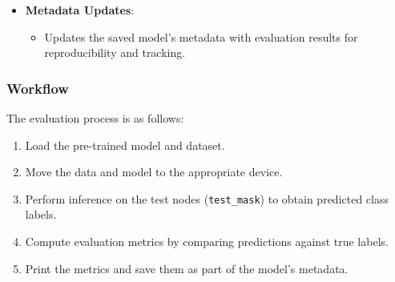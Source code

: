 {\begin{itemize}
		\item \textbf{Metadata Updates}:
		\begin{itemize}
			\item Updates the saved model's metadata with evaluation results for reproducibility and tracking.
		\end{itemize}
	\end{itemize}
	
	\subsubsection{Workflow}
	
	The evaluation process is as follows:
	\begin{enumerate}
		\item Load the pre-trained model and dataset.
		\item Move the data and model to the appropriate device.
		\item Perform inference on the test nodes (\texttt{test\_mask}) to obtain predicted class labels.
		\item Compute evaluation metrics by comparing predictions against true labels.
		\item Print the metrics and save them as part of the model's metadata.
	\end{enumerate}}
	
